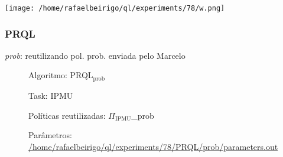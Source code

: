 \documentclass[11pt]{article}
\begin{document}
\centerline{\texttt{[image: /home/rafaelbeirigo/ql/experiments/78/w.png]}}


\subsubsection{PRQL}
\label{sec-12.4.1}

\begin{description}

\item[\emph{prob}: reutilizando pol. prob. enviada pelo Marcelo]\label{sec-12.4.1.1}


\begin{description}

\item[Algoritmo: PRQL$_{\mathrm{prob}}$]\label{sec-12.4.1.1.1}


\end{description}
\begin{description}

\item[Task: IPMU]\label{sec-12.4.1.1.2}


\end{description}
\begin{description}

\item[Políticas reutilizadas: $\Pi$$_{\mathrm{IPMU}}$\_{}prob]\label{sec-12.4.1.1.3}


\end{description}
\begin{description}

\item[Parâmetros: \href{file:///home/rafaelbeirigo/ql/experiments/78/PRQL/prob/parameters.out}{/home/rafaelbeirigo/ql/experiments/78/PRQL/prob/parameters.out}]\label{sec-12.4.1.1.4}



\end{description}
\end{description}
\end{document}
